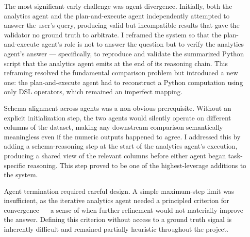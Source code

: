 The most significant early challenge was agent divergence.
Initially, both the analytics agent and the plan-and-execute agent independently attempted to answer the user's query, producing valid but incompatible results that gave the validator no ground truth to arbitrate.
I reframed the system so that the plan-and-execute agent's role is not to answer the question but to verify the analytics agent's answer --- specifically, to reproduce and validate the summarized Python script that the analytics agent emits at the end of its reasoning chain.
This reframing resolved the fundamental comparison problem but introduced a new one: the plan-and-execute agent had to reconstruct a Python computation using only DSL operators, which remained an imperfect mapping.

Schema alignment across agents was a non-obvious prerequisite.
Without an explicit initialization step, the two agents would silently operate on different columns of the dataset, making any downstream comparison semantically meaningless even if the numeric outputs happened to agree.
I addressed this by adding a schema-reasoning step at the start of the analytics agent's execution, producing a shared view of the relevant columns before either agent began task-specific reasoning.
This step proved to be one of the highest-leverage additions to the system.

Agent termination required careful design.
A simple maximum-step limit was insufficient, as the iterative analytics agent needed a principled criterion for convergence --- a sense of when further refinement would not materially improve the answer.
Defining this criterion without access to a ground truth signal is inherently difficult and remained partially heuristic throughout the project.
